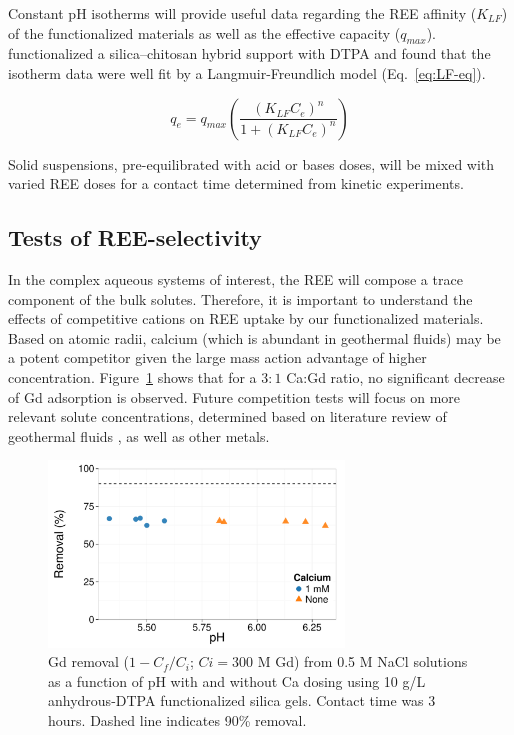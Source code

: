 Constant pH isotherms will provide useful data regarding the REE affinity ($K_{LF}$) of the functionalized materials as well as the effective capacity ($q_{max}$).
\citet{Roosen_JMC_2014} functionalized a silica--chitosan hybrid support with DTPA and found that the isotherm data were well fit by a Langmuir-Freundlich model (Eq.~\ref{eq:LF-eq}).

\begin{equation}\label{eq:LF-eq}
q_e = q_{max} \left( \frac{(K_{LF}C_e)^n}{1 + (K_{LF}C_e)^n} \right)
\end{equation}

Solid suspensions, pre-equilibrated with acid or bases doses, will be mixed with varied REE doses for a contact time determined from kinetic experiments.

\subsection{Tests of REE-selectivity}

In the complex aqueous systems of interest, the REE will compose a trace component of the bulk solutes.
Therefore, it is important to understand the effects of competitive cations on REE uptake by our functionalized materials.
Based on atomic radii, calcium (which is abundant in geothermal fluids) may be a potent competitor given the large mass action advantage of higher concentration.
Figure~\ref{fig:Ca-comp} shows that for a $3:1$ Ca:Gd ratio, no significant decrease of Gd adsorption is observed.
Future competition tests will focus on more relevant solute concentrations, determined based on literature review of geothermal fluids \citep[e.g.][]{ProdWat}, as well as other metals.

\begin{figure}[htbp]
\begin{center}
\includegraphics[width = 0.7\textwidth]{proposal_figures/DTPAa-Ca-comp.pdf}
\caption{Gd removal ($1 - C_f/C_i$; $Ci = 300$ \si{\micro}M Gd) from 0.5 M NaCl solutions as a function of pH with and without Ca dosing using 10 g/L anhydrous-DTPA functionalized silica gels.
Contact time was 3 hours.
Dashed line indicates 90\% removal. }\label{fig:Ca-comp}
\end{center}
\end{figure}
